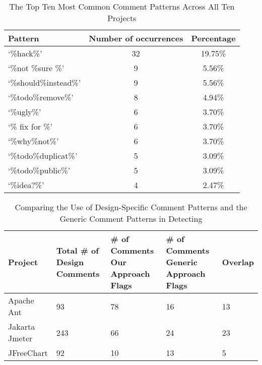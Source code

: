 \begin{table}[t]
	\begin{center}
		\caption{The Top Ten Most Common \SADTD Comment Patterns Across All Ten Projects}
		\vspace{-2mm}
		\label{tab:topperformingpatterns}
		\begin{tabular}{l| c  c}
			\toprule
			\textbf{Pattern}          & \textbf{Number of occurrences} & \textbf{Percentage} \\ 
			\midrule
			`\%hack\%'                    & 32                             & 19.75\%             \\
           		 `\%not \%sure \%'             & 9                              & 5.56\%              \\
          		  `\%should\%instead\%'         & 9                              & 5.56\%              \\
          		  `\%todo\%remove\%'            & 8                              & 4.94\%              \\
          		  `\%ugly\%'                    & 6                              & 3.70\%              \\
            		`\% fix for \%'               & 6                              & 3.70\%              \\
            		`\%why\%not\%'                & 6                              & 3.70\%              \\
            		`\%todo\%duplicat\%'          & 5                              & 3.09\%              \\
           		 `\%todo\%public\%'            & 5                              & 3.09\%              \\
           		 `\%idea?\%'                   & 4                              & 2.47\%              \\
            \bottomrule
		\end{tabular}
	\end{center}
\end{table}


\begin{table*}[!hbt]
	\begin{center}
		\caption{Comparing the Use of Design-Specific Comment Patterns and the Generic Comment Patterns in Detecting \SADTD}
		\vspace{-2mm}
		\label{tab:approach_comparisson}
		\begin{tabular}{l| p{1in} p{1in} p{1.2in} p{1in}  }
			\toprule
			\textbf{Project} &\textbf{Total \# of Design Comments} &\textbf{\# of Comments Our Approach Flags} &\textbf{\# of Comments Generic Approach Flags} &\textbf{Overlap}  \\ 
			\midrule
			Apache Ant      & 93 & 78 & 16 & 13   \\
			Jakarta Jmeter  & 243 & 66 & 24 & 23   \\
			JFreeChart      & 92 & 10 & 13 & 5  \\
			\bottomrule
		\end{tabular}
	\end{center}
\end{table*}

